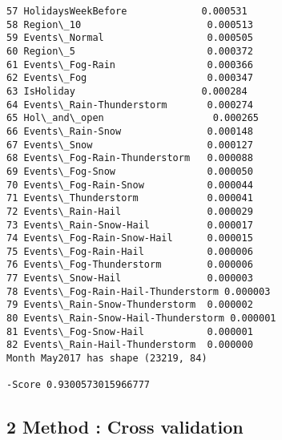\documentclass[11pt]{article}
\begin{document}
\begin{Verbatim}[commandchars=\\\{\}]
57 HolidaysWeekBefore             0.000531
58 Region\_10                      0.000513
59 Events\_Normal                  0.000505
60 Region\_5                       0.000372
61 Events\_Fog-Rain                0.000366
62 Events\_Fog                     0.000347
63 IsHoliday                      0.000284
64 Events\_Rain-Thunderstorm       0.000274
65 Hol\_and\_open                   0.000265
66 Events\_Rain-Snow               0.000148
67 Events\_Snow                    0.000127
68 Events\_Fog-Rain-Thunderstorm   0.000088
69 Events\_Fog-Snow                0.000050
70 Events\_Fog-Rain-Snow           0.000044
71 Events\_Thunderstorm            0.000041
72 Events\_Rain-Hail               0.000029
73 Events\_Rain-Snow-Hail          0.000017
74 Events\_Fog-Rain-Snow-Hail      0.000015
75 Events\_Fog-Rain-Hail           0.000006
76 Events\_Fog-Thunderstorm        0.000006
77 Events\_Snow-Hail               0.000003
78 Events\_Fog-Rain-Hail-Thunderstorm 0.000003
79 Events\_Rain-Snow-Thunderstorm  0.000002
80 Events\_Rain-Snow-Hail-Thunderstorm 0.000001
81 Events\_Fog-Snow-Hail           0.000001
82 Events\_Rain-Hail-Thunderstorm  0.000000
Month May2017 has shape (23219, 84)
	
-Score 0.9300573015966777

    \end{Verbatim}

    \subsection{2 Method : Cross validation}\label{method-cross-validation}
\end{document}
